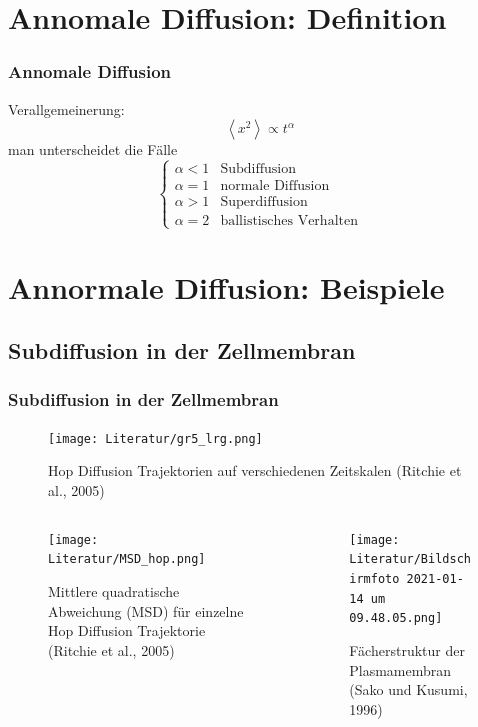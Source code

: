 \documentclass{beamer}
\begin{document}
{ %
\section{Annomale Diffusion: Definition}
	\begin{frame}
		\frametitle{Annomale Diffusion}
		Verallgemeinerung: 
		\begin{equation*}
			\left< x^2 \right> \propto t^\alpha
		\end{equation*}
		man unterscheidet die Fälle
		\begin{equation*}
			\begin{cases}
				\alpha < 1 & \text{Subdiffusion} \\
				\alpha = 1 & \text{normale Diffusion} \\
				\alpha > 1 & \text{Superdiffusion} \\
				\alpha = 2 & \text{ballistisches Verhalten}
			\end{cases}
		\end{equation*}
	\end{frame}
}
	\section{Annormale Diffusion: Beispiele}
	\subsection{Subdiffusion in der Zellmembran}
	\begin{frame}
		\frametitle{Subdiffusion in der Zellmembran}
		\vspace*{0.5cm}
			\begin{figure}
				\centering
				\texttt{[image: Literatur/gr5\_lrg.png]}
				\caption{Hop Diffusion Trajektorien auf verschiedenen Zeitskalen (Ritchie et al., 2005)}
			\end{figure}
			\vspace*{-0.5cm}
			\begin{columns}
				\begin{column}{.5\textwidth}
					\begin{figure}
						\centering
						\texttt{[image: Literatur/MSD\_hop.png]}
						\caption{Mittlere quadratische Abweichung (MSD) für einzelne Hop Diffusion Trajektorie (Ritchie et al., 2005)}
					\end{figure}
				\end{column}
				\begin{column}{.5\textwidth}
					\begin{figure}
						\centering
						\texttt{[image: Literatur/Bildschirmfoto 2021-01-14 um 09.48.05.png]}
						\caption{Fächerstruktur der Plasmamembran (Sako und Kusumi, 1996)}
					\end{figure}
				\end{column}
			\end{columns}
	\end{frame}
\end{document}
